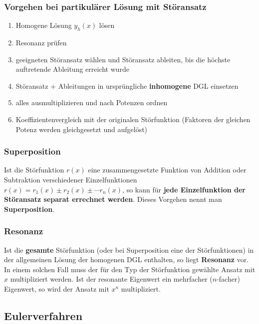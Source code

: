 \documentclass[12pt, a4paper]{scrreprt}
\begin{document}
\subsubsection{Vorgehen bei partikulärer Lösung mit Störansatz}

\begin{enumerate}
\item Homogene Lösung \(y_h(x)\) lösen
\item Resonanz prüfen
\item geeigneten Störansatz wählen und Störansatz ableiten, bis die höchste auftretende Ableitung erreicht wurde
\item Störansatz + Ableitungen in ursprüngliche \textbf{inhomogene} DGL einsetzen
\item alles ausmultiplizieren und nach Potenzen ordnen
\item Koeffizientenvergleich mit der \glqq{} originalen \grqq{} Störfunktion (Faktoren der gleichen Potenz werden gleichgesetzt und aufgelöst)
\end{enumerate}

\subsubsection{Superposition}

Ist die Störfunktion \(r(x)\) eine zusammengesetzte Funktion von Addition oder Subtraktion verschiedener Einzelfunktionen \(r(x)=r_1(x)\pm r_2(x)\pm \cdots r_n(x)\), so kann für \textbf{jede Einzelfunktion der Störansatz separat errechnet werden}. Dieses Vorgehen nennt man \textbf{Superposition}.

\subsubsection{Resonanz}

Ist die \textbf{gesamte} Störfunktion (oder bei Superposition eine der Störfunktionen) in der allgemeinen Lösung der homogenen DGL enthalten, so liegt \textbf{Resonanz} vor.\\
In einem solchen Fall muss der für den Typ der Störfunktion gewählte Ansatz mit \(x\) multipliziert werden. Ist der resonante Eigenwert ein mehrfacher (\(n\)-facher) Eigenwert, so wird der Ansatz mit \(x^n\) multipliziert.

\subsection{Eulerverfahren}
\end{document}
